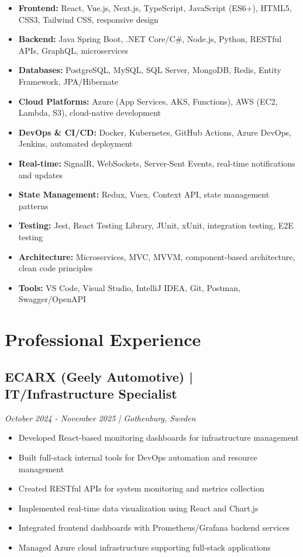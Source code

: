 \documentclass[11pt,a4paper]{article}
\begin{document}
\begin{itemize}[leftmargin=*, itemsep=2pt]
\item \textbf{Frontend:} React, Vue.js, Next.js, TypeScript, JavaScript (ES6+), HTML5, CSS3, Tailwind CSS, responsive design
\item \textbf{Backend:} Java Spring Boot, .NET Core/C\#, Node.js, Python, RESTful APIs, GraphQL, microservices
\item \textbf{Databases:} PostgreSQL, MySQL, SQL Server, MongoDB, Redis, Entity Framework, JPA/Hibernate
\item \textbf{Cloud Platforms:} Azure (App Services, AKS, Functions), AWS (EC2, Lambda, S3), cloud-native development
\item \textbf{DevOps \& CI/CD:} Docker, Kubernetes, GitHub Actions, Azure DevOps, Jenkins, automated deployment
\item \textbf{Real-time:} SignalR, WebSockets, Server-Sent Events, real-time notifications and updates
\item \textbf{State Management:} Redux, Vuex, Context API, state management patterns
\item \textbf{Testing:} Jest, React Testing Library, JUnit, xUnit, integration testing, E2E testing
\item \textbf{Architecture:} Microservices, MVC, MVVM, component-based architecture, clean code principles
\item \textbf{Tools:} VS Code, Visual Studio, IntelliJ IDEA, Git, Postman, Swagger/OpenAPI
\end{itemize}

\section*{Professional Experience}

\subsection*{ECARX (Geely Automotive) | IT/Infrastructure Specialist}
\textit{October 2024 - November 2025 | Gothenburg, Sweden}

\begin{itemize}[leftmargin=*, itemsep=2pt]
\item Developed React-based monitoring dashboards for infrastructure management
\item Built full-stack internal tools for DevOps automation and resource management
\item Created RESTful APIs for system monitoring and metrics collection
\item Implemented real-time data visualization using React and Chart.js
\item Integrated frontend dashboards with Prometheus/Grafana backend services
\item Managed Azure cloud infrastructure supporting full-stack applications
\end{itemize}
\end{document}

